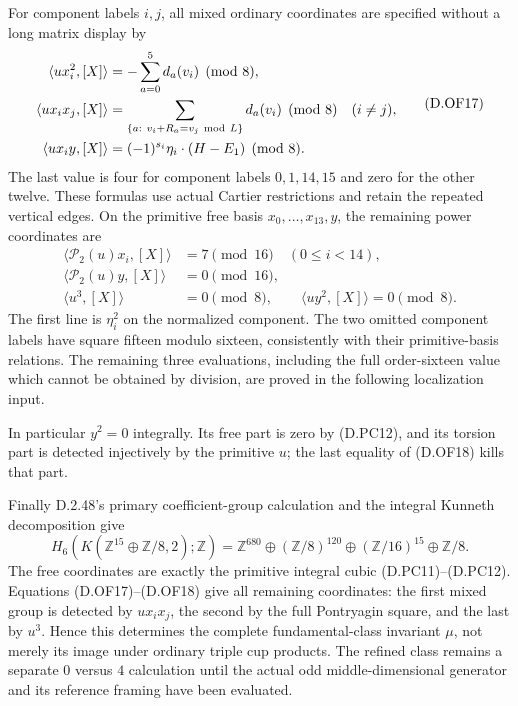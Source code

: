 For component labels \(i,j\), all mixed ordinary coordinates are
specified without a long matrix display by
\[
 \begin{aligned}
 \langle ux_i^2,[X]\rangle
                    &=-\sum_{a=0}^{5}d_a(v_i)\pmod8,\\
 \langle ux_ix_j,[X]\rangle
                    &=\sum_{\{a:\ v_i+R_a=v_j\ {\rm mod}\ L\}}
                                       d_a(v_i)\pmod8\quad(i\ne j),\\
 \langle ux_i y,[X]\rangle
                    &=(-1)^{s_i}\eta_i\cdot(H-E_1)\pmod8.
 \end{aligned}                                             \tag{D.OF17}
\]
The last value is four for component labels \(0,1,14,15\)
and zero for the other twelve. These formulas use actual
Cartier restrictions and retain the repeated vertical edges.
On the primitive free basis \(x_0,\ldots,x_{13},y\), the remaining
power coordinates are
\[
 \begin{split}
 \langle\mathcal P_2(u)x_i,[X]\rangle&=7\pmod{16}
                                             \quad(0\le i<14),\\
 \langle\mathcal P_2(u)y,[X]\rangle&=0\pmod{16},\\
 \langle u^3,[X]\rangle&=0\pmod8,\qquad
 \langle uy^2,[X]\rangle=0\pmod8.
 \end{split}                                               \tag{D.OF18}
\]
The first line is \(\eta_i^2\) on the normalized component.
The two omitted component labels have square fifteen modulo
sixteen, consistently with their primitive-basis relations.
The remaining three evaluations, including the full
order-sixteen value which cannot be obtained by division,
are proved in the following localization input.


In particular \(y^2=0\) integrally. Its free part is zero by
(D.PC12), and its torsion part is detected injectively by the
primitive \(u\); the last equality of (D.OF18) kills that part.

Finally D.2.48's primary coefficient-group calculation and
the integral Kunneth decomposition give
\[
 H_6(K(\mathbb Z^{15}\oplus\mathbb Z/8,2);\mathbb Z)
       =\mathbb Z^{680}\oplus(\mathbb Z/8)^{120}
                         \oplus(\mathbb Z/16)^{15}
                         \oplus\mathbb Z/8.              \tag{D.OF19}
\]
The free coordinates are exactly the primitive integral cubic
(D.PC11)--(D.PC12). Equations (D.OF17)--(D.OF18) give all
remaining coordinates: the first mixed group is detected by
\(ux_ix_j\), the second by the full Pontryagin square, and the
last by \(u^3\). Hence this determines the complete
fundamental-class invariant \(\mu\), not merely its image
under ordinary triple cup products.
The refined class remains a separate \(0\) versus \(4\)
calculation until the actual odd middle-dimensional generator
and its reference framing have been evaluated.

